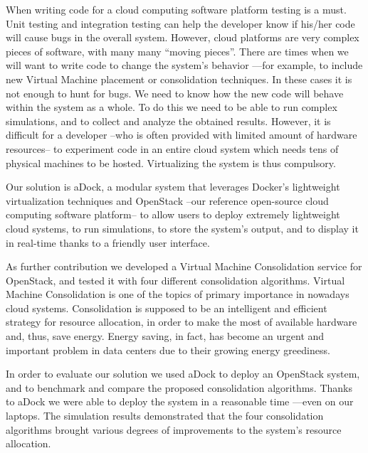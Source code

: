 \begin{spacing}{1}
When writing code for a cloud computing software platform testing is a must. Unit testing and integration testing can help the developer know if his/her code will cause bugs in the overall system. However, cloud platforms are very complex pieces of software, with many many ``moving pieces''. There are times when we will want to write code to change the system's behavior ---for example, to include new Virtual Machine placement or consolidation techniques. In these cases it is not enough to hunt for bugs. We need to know how the new code will behave within the system as a whole. To do this we need to be able to run complex simulations, and to collect and analyze the obtained results. However, it is difficult for a developer --who is often provided with limited amount of hardware resources-- to experiment code in an entire cloud system which needs tens of physical machines to be hosted. Virtualizing the system is thus compulsory.

Our solution is aDock, a modular system that leverages Docker's lightweight virtualization techniques and OpenStack --our reference open-source cloud computing software platform-- to allow users to deploy extremely lightweight cloud systems, to run simulations, to store the system's output, and to display it in real-time thanks to a friendly user interface.

As further contribution we developed a Virtual Machine Consolidation service for OpenStack, and tested it with four different consolidation algorithms. Virtual Machine Consolidation is one of the topics of primary importance in nowadays cloud systems. Consolidation is supposed to be an intelligent and efficient strategy for resource allocation, in order to make the most of available hardware and, thus, save energy. Energy saving, in fact, has become an urgent and important problem in data centers due to their growing energy greediness.

In order to evaluate our solution we used aDock to deploy an OpenStack system, and to benchmark and compare the proposed consolidation algorithms. Thanks to aDock we were able to deploy the system in a reasonable time ---even on our laptops. The simulation results demonstrated that the four consolidation algorithms brought various degrees of improvements to the system's resource allocation.
\end{spacing}